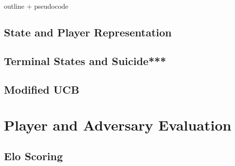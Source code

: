 \documentclass[../main.tex]{subfiles}
\begin{document}
outline + pseudocode
\subsection{State and Player Representation}

\subsection{Terminal States and Suicide***}

\subsection{Modified UCB}


\section{Player and Adversary Evaluation}
\subsection{Elo Scoring}


\appendix
\onlyinsubfile{}
\end{document}
